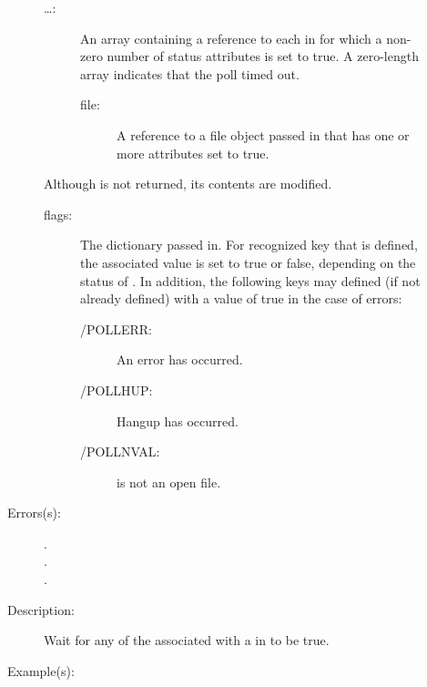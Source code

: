 \begin{description}
\begin{description}
\begin{description}
		\item[{\lb}\dots{\rb}: ]
			An array containing a reference to each  in
			\oparg{{\lt}\dots{\gt}} for which a non-zero number of
			status attributes is set to true.  A zero-length array
			indicates that the poll timed out.
			\begin{description}\item[]
			\item[file: ]
				A reference to a file object passed in that has
				one or more attributes set to true.
			\end{description}
		\end{description}
		Although \oparg{{\lt}\dots{\gt}} is not returned, its contents
		are modified.
		\begin{description}\item[]
		\item[flags: ]
			The dictionary passed in.  For recognized key that is
			defined, the associated value is set to true or false,
			depending on the status of .  In addition,
			the following keys may defined (if not already defined)
			with a value of true in the case of errors:
			\begin{description}\item[]
			\item[/POLLERR: ]
				An error has occurred.
			\item[/POLLHUP: ]
				Hangup has occurred.
			\item[/POLLNVAL: ]
				 is not an open file.
			\end{description}
		\end{description}
	\item[Errors(s): ]
		\begin{description}\item[]
		\item[.]
		\item[.]
		\item[.]
		\end{description}
	\item[Description: ]
		Wait for any of the  associated with a 
		in \oparg{{\lt}\dots{\gt}} to be true.
	\item[Example(s): ]\begin{verbatim}


\end{verbatim}
\end{description}
\end{description}

